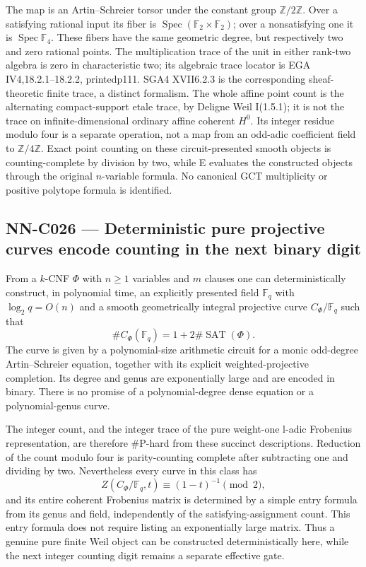 The map is an Artin--Schreier torsor under the constant group $\mathbb Z/2\mathbb Z$. Over a satisfying rational input its fiber is $\operatorname{Spec}(\mathbb F_2\times\mathbb F_2)$; over a nonsatisfying one it is $\operatorname{Spec}\mathbb F_4$. These fibers have the same geometric degree, but respectively two and zero rational points. The multiplication trace of the unit in either rank-two algebra is zero in characteristic two; its algebraic trace locator is EGA IV4,18.2.1--18.2.2, printedp111. SGA4 XVII6.2.3 is the corresponding sheaf-theoretic finite trace, a distinct formalism. The whole affine point count is the alternating compact-support etale trace, by Deligne Weil I(1.5.1); it is not the trace on infinite-dimensional ordinary affine coherent $H^0$. Its integer residue modulo four is a separate operation, not a map from an odd-adic coefficient field to $\mathbb Z/4\mathbb Z$. Exact point counting on these circuit-presented smooth objects is counting-complete by division by two, while E evaluates the constructed objects through the original $n$-variable formula. No canonical GCT multiplicity or positive polytope formula is identified.

\subsection{NN-C026 --- Deterministic pure projective curves encode counting in the next binary digit}
\begin{proposition}[NN-C026]
From a $k$-CNF $\Phi$ with $n\geq1$ variables and $m$ clauses one can deterministically construct, in polynomial time, an explicitly presented field $\mathbb F_q$ with $\log_2q=O(n)$ and a smooth geometrically integral projective curve $C_\Phi/\mathbb F_q$ such that
\[
               \#C_\Phi(\mathbb F_q)=1+2\#\operatorname{SAT}(\Phi).
\]
The curve is given by a polynomial-size arithmetic circuit for a monic odd-degree Artin--Schreier equation, together with its explicit weighted-projective completion. Its degree and genus are exponentially large and are encoded in binary. There is no promise of a polynomial-degree dense equation or a polynomial-genus curve.

The integer count, and the integer trace of the pure weight-one l-adic Frobenius representation, are therefore $\#\mathrm P$-hard from these succinct descriptions. Reduction of the count modulo four is parity-counting complete after subtracting one and dividing by two. Nevertheless every curve in this class has
\[
 Z(C_\Phi/\mathbb F_q,t)\equiv(1-t)^{-1}\pmod2,
\]
and its entire coherent Frobenius matrix is determined by a simple entry formula from its genus and field, independently of the satisfying-assignment count. This entry formula does not require listing an exponentially large matrix. Thus a genuine pure finite Weil object can be constructed deterministically here, while the next integer counting digit remains a separate effective gate.
\end{proposition}
